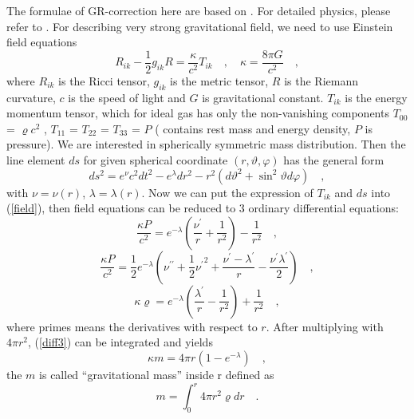 The formulae of GR-correction here are based on \cite{grbk1}. For detailed physics,
 please refer to \cite{grbk2}. For describing very strong gravitational field, we need to use Einstein 
field equations
\begin{equation}\label{field}
R_{ik}-\frac{1}{2}g_{ik}R=\frac{\kappa}{c^{2}}T_{ik} \quad , \quad
\kappa=\frac{8\pi G}{c^{2}}\quad ,
\end{equation} 
where $R_{ik}$ is the Ricci tensor, $g_{ik}$ is the metric tensor, $R$ is the Riemann curvature, $c$ is 
the speed of light and $G$ is gravitational constant. $T_{ik}$ is the energy momentum tensor, which for 
ideal gas has only the non-vanishing components $T_{00}$ = $\varrho c^2$ , $T_{11}$ = $T_{22}$ = $T_{33}$ = $P$ 
( contains rest mass and energy density, $P$ is pressure). We are interested in spherically symmetric mass 
distribution. Then the line element $ds$ for given spherical coordinate $(r, \vartheta, \varphi)$ has the 
general form
\begin{equation}\label{metric}
  ds^{2} = e^{\nu}c^{2}dt^{2}-e^{\lambda}dr^{2}-r^{2}(d\vartheta^{2}+\sin^{2}
  \vartheta d\varphi) \quad ,
\end{equation} 
with $\nu = \nu(r)$, $\lambda = \lambda(r)$. Now we can put the expression of $T_{ik}$ and $ds$ into (\ref{field}), then field equations can be reduced to 3 ordinary differential equations:
\begin{equation}\label{diff1}
   \frac{\kappa P}{c^{2}} =
   e^{-\lambda}(\frac{\nu^{\prime}}{r}+\frac{1}{r^{2}})-\frac{1}{r^{2}}
   \quad ,
\end{equation}
\begin{equation}\label{diff2}
  \frac{\kappa P}{c^{2}} =
  \frac{1}{2}e^{-\lambda}(\nu^{\prime\prime}+\frac{1}{2}{\nu^{\prime}}^{2}+\frac{\nu^
    {\prime}-\lambda^{\prime}}{r}
   -\frac{\nu^{\prime}\lambda^{\prime}}{2}) \quad ,
\end{equation}
\begin{equation}\label{diff3}
  \kappa \varrho =
  e^{-\lambda}(\frac{\lambda^{\prime}}{r}-\frac{1}{r^{2}})+\frac{1}{r^{2}} \quad ,
\end{equation} 
where primes means the derivatives with respect to $r$. After multiplying with $4\pi r^2$, (\ref{diff3}) can 
be integrated and yields
\begin{equation}\label{gmass1}
  \kappa m = 4\pi r (1-e^{-\lambda}) \quad ,
\end{equation}
the $m$ is called ``gravitational mass'' inside r defined as
\begin{equation}\label{gmass2}
  m = \int_{0}^{r}4\pi r^{2}  \varrho dr\quad .
\end{equation}      
